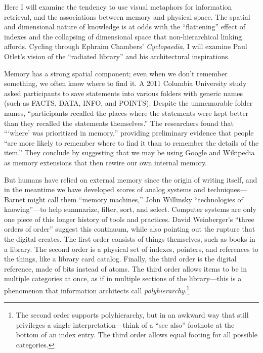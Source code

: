 Here I will examine the tendency to use visual metaphors for information retrieval, and the associations between memory and physical space. The spatial and dimensional nature of knowledge is at odds with the ``flattening'' effect of indexes and the collapsing of dimensional space that non-hierarchical linking affords. Cycling through Ephraim Chambers' \emph{Cyclopaedia}, I will examine Paul Otlet's vision of the ``radiated library'' and his architectural inspirations.

Memory has a strong spatial component; even when we don't remember something, we often know where to find it. A 2011 Columbia University study asked participants to save statements into various folders with generic names (such as FACTS, DATA, INFO, and POINTS). Despite the unmemorable folder names, ``participants recalled the places where the statements were kept better than they recalled the statements themselves.'' The researchers found that ``\thinspace `where' was prioritized in memory,'' providing preliminary evidence that people ``are more likely to remember where to find it than to remember the details of the item.''\autocite{sparrow_google_2011} They conclude by suggesting that we may be using Google and Wikipedia as memory extensions that then rewire our own internal memory.

But humans have relied on external memory since the origin of writing itself, and in the meantime we have developed scores of analog systems and techniques---Barnet might call them ``memory machines,'' John Willinsky ``technologies of knowing''---to help summarize, filter, sort, and select. Computer systems are only one piece of this longer history of tools and practices. David Weinberger's ``three orders of order'' suggest this continuum, while also pointing out the rupture that the digital creates. The first order consists of things themselves, such as books in a library. The second order is a physical set of indexes, pointers, and references to the things, like a library card catalog. Finally, the third order is the digital reference, made of bits instead of atoms.\autocite[17-23]{weinberger_everything_2008} The third order allows items to be in multiple categories at once, as if in multiple sections of the library---this is a phenomenon that information architects call \emph{polyhierarchy}.\footnote{The second order supports polyhierarchy, but in an awkward way that still privileges a single interpretation---think of a ``see also'' footnote at the bottom of an index entry. The third order allows equal footing for all possible categories.}

